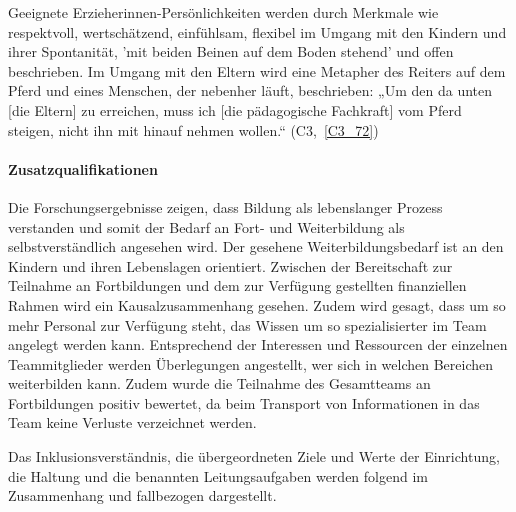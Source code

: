 Geeignete Erzieherinnen-Persönlichkeiten werden durch Merkmale wie respektvoll, wertschätzend, einfühlsam, flexibel im Umgang mit den Kindern und ihrer Spontanität, 'mit beiden Beinen auf dem Boden stehend' und offen beschrieben.
Im Umgang mit den Eltern wird eine Metapher des Reiters auf dem Pferd und eines Menschen, der nebenher läuft, beschrieben:  
„Um den da unten [die Eltern] zu erreichen, muss ich [die pädagogische Fachkraft] vom Pferd steigen, nicht ihn mit hinauf nehmen wollen.“ (C3,~\ref{C3_72}) 

\paragraph{Zusatzqualifikationen}

Die Forschungsergebnisse zeigen, dass Bildung als lebenslanger Prozess verstanden und somit der Bedarf an Fort- und Weiterbildung als selbstverständlich angesehen wird. Der gesehene Weiterbildungsbedarf ist an den Kindern und ihren Lebenslagen orientiert.
Zwischen der Bereitschaft zur Teilnahme an Fortbildungen und dem zur Verfügung gestellten finanziellen Rahmen wird ein Kausalzusammenhang gesehen. Zudem wird gesagt, dass um so mehr Personal zur Verfügung steht, das Wissen um so spezialisierter im Team angelegt werden kann. Entsprechend der Interessen und Ressourcen der einzelnen Teammitglieder werden Überlegungen angestellt, wer sich in welchen Bereichen weiterbilden kann. Zudem wurde die Teilnahme des Gesamtteams an Fortbildungen positiv bewertet, da beim Transport von Informationen in das Team keine Verluste verzeichnet werden. 

Das Inklusionsverständnis, die übergeordneten Ziele und Werte der Einrichtung, die Haltung und die benannten Leitungsaufgaben werden folgend im Zusammenhang und fallbezogen dargestellt. 

